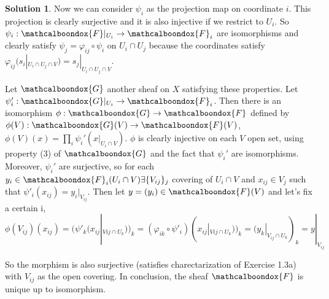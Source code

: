 \documentclass[12pt]{article}
\theoremstyle{definition}
\newtheorem*{sol}{Solution}
\newcommand{\sF}{\ensuremath{\mathcalboondox{F}}}
\newcommand{\sG}{\ensuremath{\mathcalboondox{G}}}
\begin{document}
\begin{sol}
	Now we can consider $\psi_i$ as the projection map on coordinate $i$. This projection is clearly surjective and it is also injective if we restrict to $U_i$. So $\psi_i: \sF|_{U_i} \to \sF_i$ are isomorphisms and clearly satisfy $\psi_j = \varphi_{ij} \circ \psi_i$ on $U_i \cap U_j$ because the coordinates satisfy $\varphi_{ij}(s_i|_{U_i \cap U_j \cap V}) = s_j|_{U_i \cap U_j \cap V}$.

	Let $\sG$ another sheaf on $X$ satisfying these properties. Let $\psi_i': \sG|_{U_i} \to \sF_i$. Then there is an isomorphism $\phi: \sG \to \sF$ defined by $\phi(V): \sG(V) \to \sF(V)$, $\phi(V)(x) = \prod_i \psi_i'(x|_{U_i \cap V})$. $\phi$ is clearly injective on each $V$ open set, using property (3) of $\sG$ and the fact that $\psi_i'$ are isomorphisms. Moreover, $\psi_i'$ are surjective, so for each $y_i \in \sF_i(U_i \cap V) \exists \{V_{ij}\}_j$ covering of $U_i \cap V$ and $x_{ij} \in V_j$ such that $\psi'_i(x_{ij}) = y_i|_{V_{ij}}$. Then let $y = (y_i) \in \sF(V)$ and let's fix a certain i, 
	\[
		\phi(V_{ij})(x_{ij}) = (\psi'_k(x_{ij}|_{V{ij} \cap U_k}))_k = (\varphi_{ik} \circ \psi'_i)(x_{ij}|_{V{ij} \cap U_k}))_k = (y_k|_{V_{ij} \cap U_k})_k = y|_{V_{ij}}
	\]

	So the morphism is also surjective (satisfies charectarization of Exercise 1.3a) with $V_{ij}$ as the open covering. In conclusion, the sheaf $\sF$ is unique up to isomorphism.
\end{sol}
\end{document}
